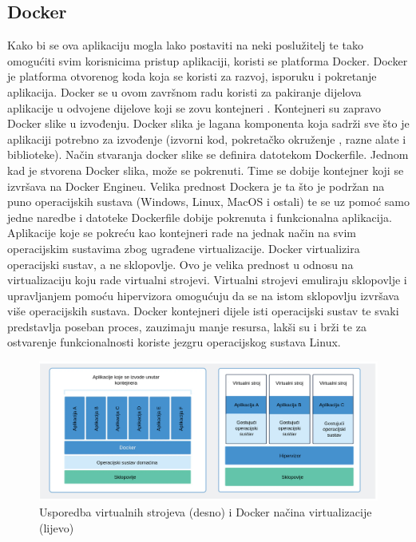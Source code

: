 \documentclass[times, utf8, zavrsni]{fer}
\begin{document}
\subsection{Docker}
Kako bi se ova aplikaciju mogla lako postaviti  na neki poslužitelj te tako omogućiti svim korisnicima pristup aplikaciji,
koristi se platforma Docker. Docker je platforma otvorenog koda koja se koristi za razvoj, isporuku i pokretanje aplikacija.
Docker se u ovom završnom radu koristi za pakiranje dijelova aplikacije u odvojene dijelove koji se zovu kontejneri .
Kontejneri su zapravo Docker slike  u izvođenju. Docker slika je lagana  komponenta koja sadrži sve što je aplikaciji 
potrebno za izvođenje (izvorni kod, pokretačko okruženje , razne alate i biblioteke). Način stvaranja docker slike se definira 
datotekom Dockerfile. Jednom kad je stvorena Docker slika, može se pokrenuti. Time se dobije kontejner koji se izvršava na Docker Engineu. 
Velika prednost Dockera je ta što je podržan na puno operacijskih sustava (Windows, Linux, MacOS i ostali) te se uz pomoć samo jedne naredbe i datoteke Dockerfile
dobije pokrenuta i funkcionalna aplikacija. Aplikacije koje se pokreću kao kontejneri rade na jednak način na svim operacijskim sustavima zbog ugrađene virtualizacije.
Docker virtualizira operacijski sustav, a ne sklopovlje. Ovo je velika prednost u odnosu na virtualizaciju koju rade virtualni strojevi. 
Virtualni strojevi emuliraju sklopovlje i upravljanjem pomoću hipervizora omogućuju da se na istom sklopovlju izvršava više operacijskih sustava. 
Docker kontejneri dijele isti operacijski sustav te svaki predstavlja poseban proces, zauzimaju manje 
resursa, lakši su i brži te za ostvarenje funkcionalnosti koriste jezgru operacijskog sustava Linux.

\begin{figure}[htb]
    \hspace*{-1cm}
    \includegraphics[scale=0.36]{slika2.png}
    \caption{Usporedba virtualnih strojeva (desno) i Docker načina virtualizacije (lijevo)}
    \label{fig:docker}
    \end{figure}
\end{document}
